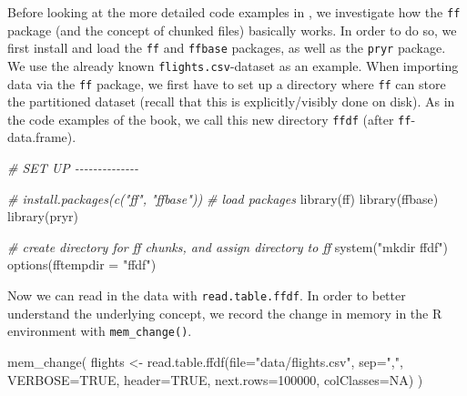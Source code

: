 \documentclass[
  12pt,
]{style/krantz}
\newenvironment{Shaded}{\begin{snugshade}}{\end{snugshade}}
\newcommand{\AttributeTok}[1]{\textcolor[rgb]{0.77,0.63,0.00}{#1}}
\newcommand{\CommentTok}[1]{\textcolor[rgb]{0.56,0.35,0.01}{\textit{#1}}}
\newcommand{\ConstantTok}[1]{\textcolor[rgb]{0.00,0.00,0.00}{#1}}
\newcommand{\DecValTok}[1]{\textcolor[rgb]{0.00,0.00,0.81}{#1}}
\newcommand{\FunctionTok}[1]{\textcolor[rgb]{0.00,0.00,0.00}{#1}}
\newcommand{\NormalTok}[1]{#1}
\newcommand{\OtherTok}[1]{\textcolor[rgb]{0.56,0.35,0.01}{#1}}
\newcommand{\StringTok}[1]{\textcolor[rgb]{0.31,0.60,0.02}{#1}}
\begin{document}
Before looking at the more detailed code examples in \citet{walkowiak_2016}, we investigate how the \texttt{ff} package (and the concept of chunked files) basically works. In order to do so, we first install and load the \texttt{ff} and \texttt{ffbase} packages, as well as the \texttt{pryr} package. We use the already known \texttt{flights.csv}-dataset as an example. When importing data via the \texttt{ff} package, we first have to set up a directory where \texttt{ff} can store the partitioned dataset (recall that this is explicitly/visibly done on disk). As in the code examples of the book, we call this new directory \texttt{ffdf} (after \texttt{ff}-data.frame).

\begin{Shaded}
\begin{Highlighting}[]
\CommentTok{\# SET UP {-}{-}{-}{-}{-}{-}{-}{-}{-}{-}{-}{-}{-}{-}}

\CommentTok{\# install.packages(c("ff", "ffbase"))}
\CommentTok{\# load packages}
\FunctionTok{library}\NormalTok{(ff)}
\FunctionTok{library}\NormalTok{(ffbase)}
\FunctionTok{library}\NormalTok{(pryr)}

\CommentTok{\# create directory for ff chunks, and assign directory to ff }
\FunctionTok{system}\NormalTok{(}\StringTok{"mkdir ffdf"}\NormalTok{)}
\FunctionTok{options}\NormalTok{(}\AttributeTok{fftempdir =} \StringTok{"ffdf"}\NormalTok{)}
\end{Highlighting}
\end{Shaded}

Now we can read in the data with \texttt{read.table.ffdf}. In order to better understand the underlying concept, we record the change in memory in the R environment with \texttt{mem\_change()}.

\begin{Shaded}
\begin{Highlighting}[]
\FunctionTok{mem\_change}\NormalTok{(}
\NormalTok{flights }\OtherTok{\textless{}{-}} 
     \FunctionTok{read.table.ffdf}\NormalTok{(}\AttributeTok{file=}\StringTok{"data/flights.csv"}\NormalTok{,}
                     \AttributeTok{sep=}\StringTok{","}\NormalTok{,}
                     \AttributeTok{VERBOSE=}\ConstantTok{TRUE}\NormalTok{,}
                     \AttributeTok{header=}\ConstantTok{TRUE}\NormalTok{,}
                     \AttributeTok{next.rows=}\DecValTok{100000}\NormalTok{,}
                     \AttributeTok{colClasses=}\ConstantTok{NA}\NormalTok{)}
\NormalTok{)}
\end{Highlighting}
\end{Shaded}
\end{document}
